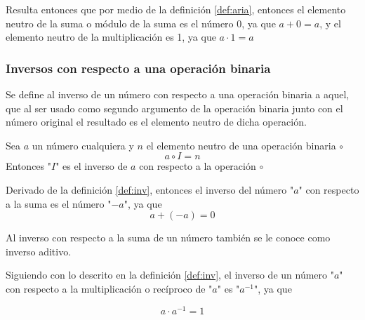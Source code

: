 \documentclass[11pt,letterpaper]{article}
\begin{document}
	Resulta entonces que por medio de la definición \ref{def:aria}, entonces el elemento neutro de la suma o módulo de la suma es el número 0, ya que $a+0=a$, y el elemento neutro de la multiplicación es 1, ya que $a \cdot 1 = a$
	
	\subsubsection{Inversos con respecto a una operación binaria}
	
	Se define al inverso de un número con respecto a una operación binaria a aquel, que al ser usado como segundo argumento de la operación binaria junto con el número original el resultado es el elemento neutro de dicha operación.
	
	\begin{definición} \label{def:inv}
		Sea $a$ un número cualquiera y $n$ el elemento neutro de una operación binaria $\circ$
		\begin{equation}
			a \circ I = n \label{ec:inv}
		\end{equation}
		Entonces "$I$" es el inverso de $a$ con respecto a la operación $\circ$
	\end{definición}
	
	Derivado de la definición \ref{def:inv}, entonces el inverso del número "$a$" con respecto a la suma es el número "$-a$", ya que
	\begin{equation}
		a + (-a) = 0
	\end{equation}

	Al inverso con respecto a la suma de un número también se le conoce como inverso aditivo.
	
	Siguiendo con lo descrito en la definición \ref{def:inv}, el inverso de un número "$a$" con respecto a la multiplicación o recíproco de "$a$" es "$a^{-1}$", ya que
	
	\begin{equation}
		a \cdot a^{-1} = 1
	\end{equation}
	
	
	
	
	\printbibliography[title={Referencias}]
	
\end{document}
